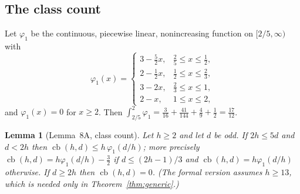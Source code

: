 \documentclass[11pt]{amsart}
\newtheorem{lemma}[theorem]{Lemma}
\theoremstyle{definition}
\theoremstyle{remark}
\numberwithin{equation}{section}
\newcommand{\cb}{\operatorname{cb}}
\begin{document}
\subsection{The class count}
Let $\varphi_1$ be the continuous, piecewise linear, nonincreasing function on $[2/5,\infty)$ with
\[
  \varphi_1(x)=\begin{cases}3-\tfrac52x,&\tfrac25\le x\le\tfrac12,\\ 2-\tfrac12x,&\tfrac12\le x\le\tfrac23,\\
  3-2x,&\tfrac23\le x\le1,\\ 2-x,&1\le x\le2,\end{cases}
\]
and $\varphi_1(x)=0$ for $x\ge2$. Then $\int_{2/5}^{2}\varphi_1=\frac3{16}+\frac{41}{144}+\frac49+\frac12=\frac{17}{12}$.

\begin{lemma}[Lemma~8A, class count]\label{lem:classcount}
Let $h\ge2$ and let $d$ be odd. If $2h\le5d$ and $d<2h$ then $\cb(h,d)\le h\,\varphi_1(d/h)$; more precisely
$\cb(h,d)=h\varphi_1(d/h)-\frac32$ if $d\le(2h-1)/3$ and $\cb(h,d)=h\varphi_1(d/h)$ otherwise. If $d\ge2h$ then $\cb(h,d)=0$.
(The formal version assumes $h\ge13$, which is needed only in Theorem~\ref{thm:generic}.)
\end{lemma}
\end{document}
